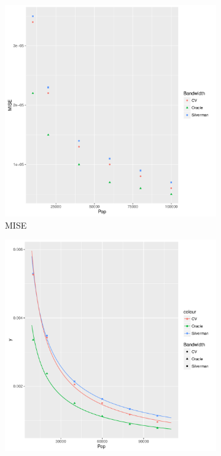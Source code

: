 \begin{figure}[htb]
    \centering
    \begin{subfigure}[b]{0.3\textwidth}
    \includegraphics[width=\textwidth]{results/by_pop_size/MISE-vs-population}
    \caption{MISE}
    \end{subfigure}
    \begin{subfigure}[b]{0.3\textwidth}
    \includegraphics[width=\textwidth]{results/by_pop_size/RMISE-vs-population}

\end{subfigure}
\end{figure}
